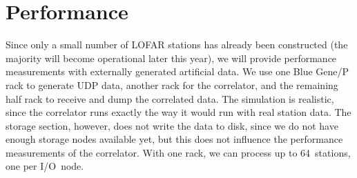 \documentclass{sig-alternate}
\begin{document}
%
\label{sec:results}



\section{Performance}
\label{sec:performance}

Since only a small number of LOFAR stations has already been constructed
(the majority will become operational later this year), we will provide 
performance measurements with externally generated artificial data.
We use one Blue Gene/P rack to generate UDP data, another rack for the
correlator, and the remaining half rack to receive and dump the correlated
data.
The simulation is realistic, since the correlator runs exactly
the way it would run with real station data.
The storage section, however, does not write the data to disk, since we do
not have enough storage nodes available yet, but this does not influence the
performance measurements of the correlator.
With one rack, we can process up to 64~stations, one per I/O~node.
\end{document}
